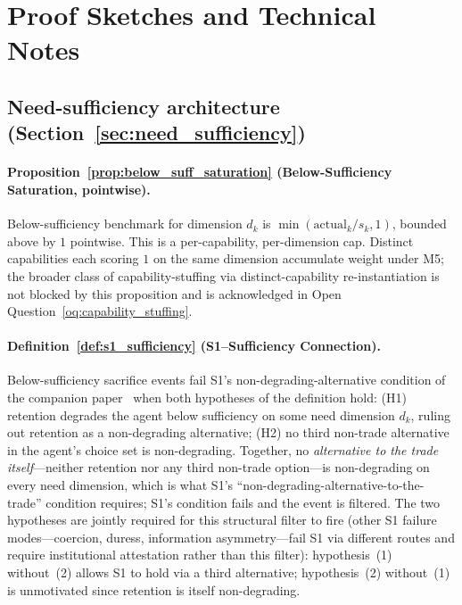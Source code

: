 \section{Proof Sketches and Technical Notes}
\label{app:proofs}

\subsection{Need-sufficiency architecture
(Section~\ref{sec:need_sufficiency})}

\paragraph{Proposition~\ref{prop:below_suff_saturation}
(Below-Sufficiency Saturation, pointwise).}
Below-sufficiency benchmark for dimension $d_k$ is
$\min(\mathrm{actual}_k / s_k, 1)$, bounded above by $1$
pointwise.  This is a per-capability, per-dimension cap.
Distinct capabilities each
scoring $1$ on the same dimension accumulate weight under M5;
the broader class of capability-stuffing via distinct-capability
re-instantiation is not blocked by this proposition and is
acknowledged in Open
Question~\ref{oq:capability_stuffing}.

\paragraph{Definition~\ref{def:s1_sufficiency}
(S1--Sufficiency Connection).}
Below-sufficiency sacrifice events fail S1's
non-degrading-alternative condition of the companion
paper~\citep[Revealed~Sacrifice]{lasser2026paper8a} when both
hypotheses of the definition hold: (H1) retention degrades the
agent below sufficiency on some need dimension $d_k$, ruling
out retention as a non-degrading alternative; (H2) no third
non-trade alternative in the agent's choice set is non-degrading.
Together, no
\emph{alternative to the trade itself}---neither retention nor
any third non-trade option---is non-degrading on every need
dimension, which is what S1's
``non-degrading-alternative-to-the-trade'' condition requires;
S1's condition fails and the event is filtered.
The two hypotheses are jointly required for this structural
filter to fire (other S1 failure modes---coercion, duress,
information asymmetry---fail S1 via different routes and
require institutional attestation rather than this filter):
hypothesis~(1) without~(2) allows S1 to hold via a third
alternative; hypothesis~(2) without~(1) is unmotivated since
retention is itself non-degrading.

